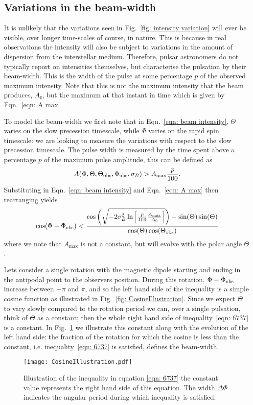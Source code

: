 \documentclass[../full_thesis/full_thesis.tex]{subfiles}
\begin{document}
\subsection{Variations in the beam-width}
It is unlikely that the variations seen in Fig.~\ref{fig: intensity variation}
will ever be visible, over longer time-scales of course, in nature. This is because
in real observations the intensity will also be subject to variations in the
amount of dispersion from the interstellar medium. Therefore, pulsar astronomers
do not typically report on intensities themselves, but characterise the pulsation
by their beam-width. This is the width of the pulse at some percentage $p$ of
the observed maximum intensity. Note that this is not the maximum intensity that
the beam produces, $A_0$, but the maximum at that instant in time which is
given by Eqn.~\eqref{eqn: A max}

To model the beam-width we first note that in Eqn.~\eqref{eqn: beam intensity},
$\Theta$ varies on the slow precession timescale, while $\Phi$ varies on the
rapid spin timescale: we are looking to measure the variations with respect to
the slow precession timescale.  The pulse width is measured by the time spent
above a percentage $p$ of the maximum pulse amplitude, this can be defined as
\begin{align}
A(\Phi, \Theta, \Theta_{\mathrm{obs}}, \Phi_{\mathrm{obs}}, \sigma_{B}) > A_{\textrm{max}} \frac{p}{100}.
\end{align}
Substituting in Eqn.~\eqref{eqn: beam intensity} and Eqn.~\eqref{eqn: A max}
then rearranging yields
\begin{equation}
\cos(\Phi - \Phi_{\mathrm{obs}}) < \frac{
\cos\left(
\sqrt{-2\sigma_{B}^{2} \ln\left[\frac{p}{100}\frac{A_\textrm{max}}{A_0}\right]}\right) - \sin(\Theta)\sin(\Theta)}
                          {\cos(\Theta)\cos(\Theta_{\mathrm{obs}})}
\label{eqn: 6737}
\end{equation}
where we note that $A_\textrm{max}$ is not a constant, but will evolve with the
polar angle $\Theta$.

Lets consider a single rotation with the magnetic dipole starting and ending in
the antipodal point to the observers position. During this rotation, $\Phi -
\Phi_{\mathrm{obs}}$ increase between $-\pi$ and $\pi$, and so the left hand side of the
inequality is a simple cosine function as illustrated in Fig.~\ref{fig:
CosineIllustration}.  Since we expect $\Theta$ to vary slowly compared to the
rotation period we can, over a single pulsation, think of $\Theta$ as a
constant; then the whole right hand side of inequality~\eqref{eqn: 6737} is a
constant. In Fig.~\ref{fig: CosineIllustration} we illustrate this constant
along with the evolution of the left hand side: the fraction of the rotation
for which the cosine is less than the constant, i.e. inequality~\eqref{eqn: 6737}
is satisfied, defines the beam-width.
\begin{figure}[ht]
\centering
\texttt{[image: CosineIllustration.pdf]}
\caption{Illustration of the inequality in equation \eqref{eqn: 6737} the constant
         value represents the right hand side of this equation. The
         width $\Delta\Phi$ indicates the angular period during which inequality
         is satisfied.}
\label{fig: CosineIllustration}
\end{figure}
\end{document}
